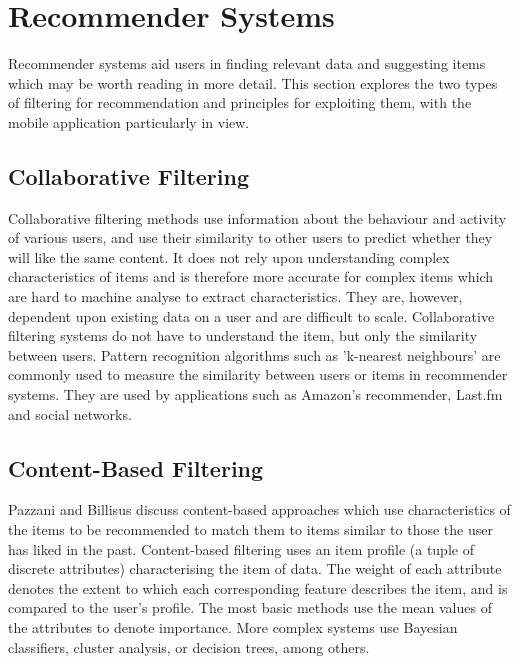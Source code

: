 \section{Recommender Systems}

Recommender systems aid users in finding relevant data and suggesting items which may be worth reading in more detail. This section explores the two types of filtering for recommendation and principles for exploiting them, with the mobile application particularly in view.

\subsection{Collaborative Filtering}

Collaborative filtering methods \cite{CollaborativeRecommenderGoldberg} use information about the behaviour and activity of various users, and use their similarity to other users to predict whether they will like the same content. It does not rely upon understanding complex characteristics of items and is therefore more accurate for complex items which are hard to machine analyse to extract characteristics. They are, however, dependent upon existing data on a user and are difficult to scale. Collaborative filtering systems do not have to understand the item, but only the similarity between users. Pattern recognition algorithms such as 'k-nearest neighbours' are commonly used to measure the similarity between users or items in recommender systems. They are used by applications such as Amazon's recommender, Last.fm and social networks. 

\subsection{Content-Based Filtering}

Pazzani and Billisus discuss content-based approaches \cite{ContentRecommenderPazzani} which use characteristics of the items to be recommended to match them to items similar to those the user has liked in the past. Content-based filtering uses an item profile (a tuple of discrete attributes) characterising the item of data. The weight of each attribute denotes the extent to which each corresponding feature describes the item, and is compared to the user's profile. The most basic methods use the mean values of the attributes to denote importance. More complex systems use Bayesian classifiers, cluster analysis, or decision trees, among others.


